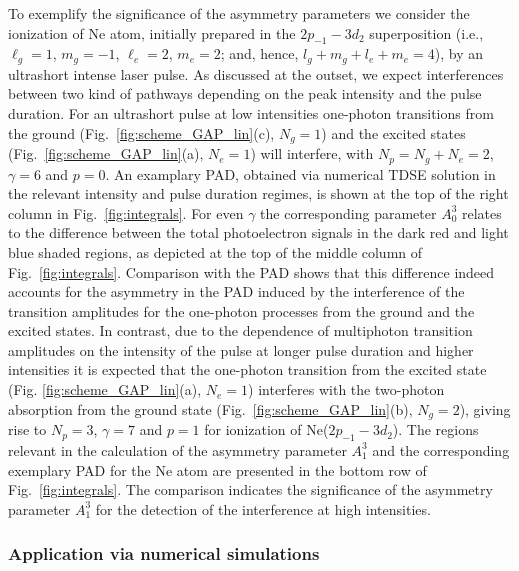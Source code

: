To exemplify the significance of the asymmetry parameters we consider the ionization of Ne atom, initially prepared in the $2p_{-1}-3d_2$ superposition (i.e., $\ell_g = 1$, $m_g = -1$, $\ell_e = 2$, $m_e = 2$; and, hence, $l_g + m_g + l_e + m_e = 4$), by an ultrashort intense laser pulse. As discussed at the outset, we expect interferences between two kind of pathways depending on the peak intensity and the pulse duration. 
For an ultrashort pulse at low intensities one-photon transitions from the ground (Fig.\ \ref{fig:scheme_GAP_lin}(c), $N_g = 1$) and the excited states (Fig.\ \ref{fig:scheme_GAP_lin}(a), $N_e = 1$) will interfere, with $N_p = N_g + N_e = 2$, $\gamma = 6$ and $p=0$. An examplary PAD, obtained via numerical TDSE solution in the relevant intensity and pulse duration regimes, is shown at the top of the right column in Fig.~\ref{fig:integrals}. For even $\gamma$ the corresponding parameter $A_0^3$ relates to the difference between the total photoelectron signals in the dark red and light blue shaded regions, as depicted at the top of the middle column of Fig.~\ref{fig:integrals}. Comparison with the PAD shows that this difference indeed accounts for the asymmetry in the PAD induced by the interference of the transition amplitudes for the one-photon processes from the ground and the excited states. In contrast, due to the dependence of multiphoton transition amplitudes on the intensity of the pulse at longer pulse duration and higher intensities it is expected that the one-photon transition from the excited state (Fig. \ref{fig:scheme_GAP_lin}(a), $N_e = 1$) interferes with the two-photon absorption from the ground state (Fig.\ \ref{fig:scheme_GAP_lin}(b), $N_g = 2$), giving rise to $N_p = 3$, $\gamma = 7$ and $p=1$ for ionization of Ne($2p_{-1}-3d_2$). The regions relevant in the calculation of the asymmetry parameter $A_1^3$ and the corresponding exemplary PAD for the Ne atom are presented in the bottom row of Fig.~\ref{fig:integrals}. The comparison indicates the significance of the asymmetry parameter $A_1^3$ for the detection of the interference at high intensities.

\subsubsection{Application via numerical simulations}

